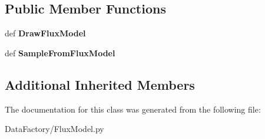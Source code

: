 \subsection*{Public Member Functions}
\begin{DoxyCompactItemize}
\item 
\mbox{\label{classMIS_1_1DataFactory_1_1FluxModel_1_1FluxModelFromFormula_a0ac8cda7e94221475878dd5d928bfd0f}} 
def {\bfseries Draw\+Flux\+Model}
\item 
\mbox{\label{classMIS_1_1DataFactory_1_1FluxModel_1_1FluxModelFromFormula_a206408662935fc00a13167dd27dbb131}} 
def {\bfseries Sample\+From\+Flux\+Model}
\end{DoxyCompactItemize}
\subsection*{Additional Inherited Members}


The documentation for this class was generated from the following file\+:\begin{DoxyCompactItemize}
\item 
Data\+Factory/Flux\+Model.\+py\end{DoxyCompactItemize}
